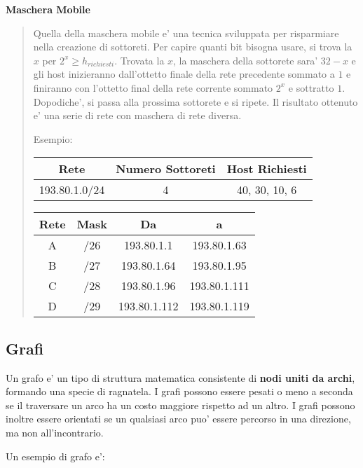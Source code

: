 \documentclass{article}
\begin{document}
{    \textbf{Maschera Mobile}
    \begin{quote}
      Quella della maschera mobile e' una tecnica sviluppata per risparmiare nella creazione di sottoreti. Per capire quanti bit bisogna usare, si trova la $ x $ per $ 2^x \geqslant h_{richiesti} $. Trovata la $ x $, la maschera della sottorete sara' $ 32 - x $ e gli host inizieranno dall'ottetto finale della rete precedente sommato a $ 1 $ e finiranno con l'ottetto final della rete corrente sommato $ 2^x $ e sottratto $ 1 $. Dopodiche', si passa alla prossima sottorete e si ripete. Il risultato ottenuto e' una serie di rete con maschera di rete diversa.

      Esempio:

      \begin{tabular}{ |c|c|c| }
        \hline
        Rete & Numero Sottoreti & Host Richiesti \\
        \hline
        193.80.1.0/24 & 4 & 40, 30, 10, 6 \\
        \hline
      \end{tabular}

      \begin{tabular}{ |c|c|c|c| }
        \hline
        Rete & Mask & Da & a \\
        \hline
        A & /26 & 193.80.1.1 & 193.80.1.63 \\
        B & /27 & 193.80.1.64 & 193.80.1.95 \\
        C & /28 & 193.80.1.96 & 193.80.1.111 \\
        D & /29 & 193.80.1.112 & 193.80.1.119 \\
        \hline
      \end{tabular}
    \end{quote}

    \break

    \subsection{Grafi}
    Un grafo e' un tipo di struttura matematica consistente di \textbf{nodi uniti da archi}, formando una specie di ragnatela. I grafi possono essere pesati o meno a seconda se il traversare un arco ha un costo maggiore rispetto ad un altro. I grafi possono inoltre essere orientati se un qualsiasi arco puo' essere percorso in una direzione, ma non all'incontrario.

    Un esempio di grafo e':

    }
\end{document}
